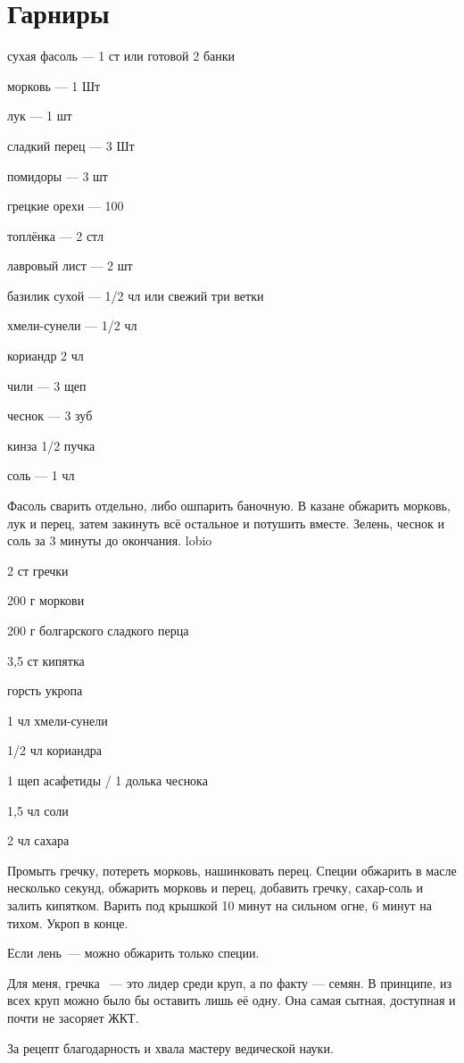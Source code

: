 \chapter*{Гарниры}
\label{sec:garnish}



{
\item сухая фасоль — 1 ст или готовой 2 банки
\item морковь — 1 Шт
\item лук — 1 шт
\item сладкий перец — 3 Шт
\item помидоры — 3 шт
\item грецкие орехи — 100 
\item топлёнка — 2 стл 
}{
\item лавровый лист — 2 шт
\item базилик сухой — 1/2 чл или свежий три ветки
\item хмели-сунели — 1/2 чл
\item кориандр 2 чл
\item чили — 3 щеп
\item чеснок — 3 зуб
\item кинза 1/2 пучка
\item соль — 1 чл
}{
Фасоль сварить отдельно, либо ошпарить баночную. В казане обжарить морковь, лук и перец, затем закинуть всё остальное и потушить вместе. Зелень, чеснок и соль за 3 минуты до окончания.
}{}{lobio}

{
\item 2 ст гречки
\item 200 г моркови
\item 200 г болгарского сладкого перца
\item 3,5 ст кипятка
\item горсть укропа
}{
\item 1 чл хмели-сунели
\item 1/2 чл кориандра
\item 1 щеп асафетиды / 1 долька чеснока
\item 1,5 чл соли
\item 2 чл сахара
}{
Промыть гречку, потереть морковь, нашинковать перец. Специи обжарить в масле несколько секунд, обжарить морковь и перец, добавить гречку, сахар-соль и залить кипятком. Варить под крышкой 10 минут на сильном огне, 6 минут на тихом. Укроп в конце.
}{
\begin{advice}
\item Если лень~--- можно обжарить только специи.
\item Для меня, гречка ~--- это лидер среди круп, а по факту — семян. В принципе, из всех круп можно было бы оставить лишь её одну. Она самая сытная, доступная и почти не засоряет ЖКТ. 
\item За рецепт благодарность и хвала мастеру ведической науки. 
\end{advice}}{}



